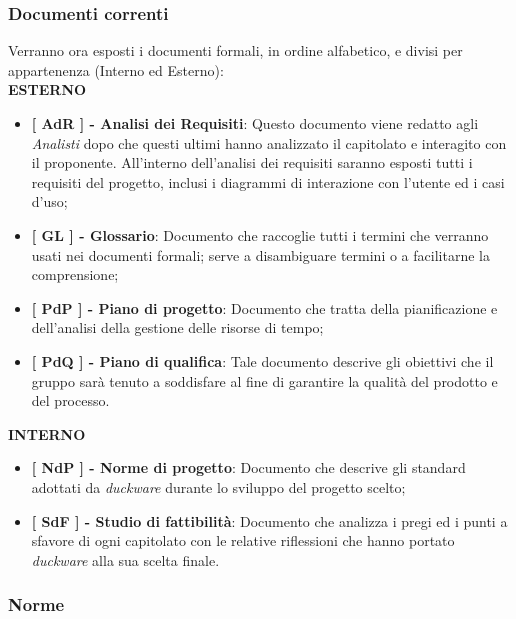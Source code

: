 \subsubsection{Documenti correnti}
Verranno ora esposti i documenti formali, in ordine alfabetico, e divisi per appartenenza (Interno ed Esterno):\\[0.5cm]
\textbf{ESTERNO}
\begin{itemize}
    \item \textbf{[ AdR ] - Analisi dei Requisiti}: Questo documento viene redatto agli \emph{Analisti} dopo che questi ultimi hanno analizzato il capitolato e interagito con il proponente. All’interno dell’analisi dei requisiti saranno esposti tutti i requisiti del progetto, inclusi i diagrammi di interazione con l’utente ed i casi d’uso;
    \item \textbf{[ GL ] - Glossario}: Documento che raccoglie tutti i termini che verranno usati nei documenti formali; serve a disambiguare termini o a facilitarne la comprensione;
    \item \textbf{[ PdP ] - Piano di progetto}: Documento che tratta della pianificazione e dell’analisi della gestione delle risorse di tempo;
    \item \textbf{[ PdQ ] - Piano di qualifica}: Tale documento descrive gli obiettivi che il gruppo sarà tenuto a soddisfare al fine di garantire la qualità del prodotto e del processo.
\end{itemize}
\textbf{INTERNO}
\begin{itemize}
    \item \textbf{[ NdP ] - Norme di progetto}: Documento che descrive gli standard adottati da \emph{duckware} durante lo sviluppo del progetto scelto;
    \item \textbf{[ SdF ] - Studio di fattibilità}: Documento che analizza i pregi ed i punti a sfavore di ogni capitolato con le relative riflessioni che hanno portato \emph{duckware} alla sua scelta finale.

\end{itemize}

\subsubsection{Norme}
